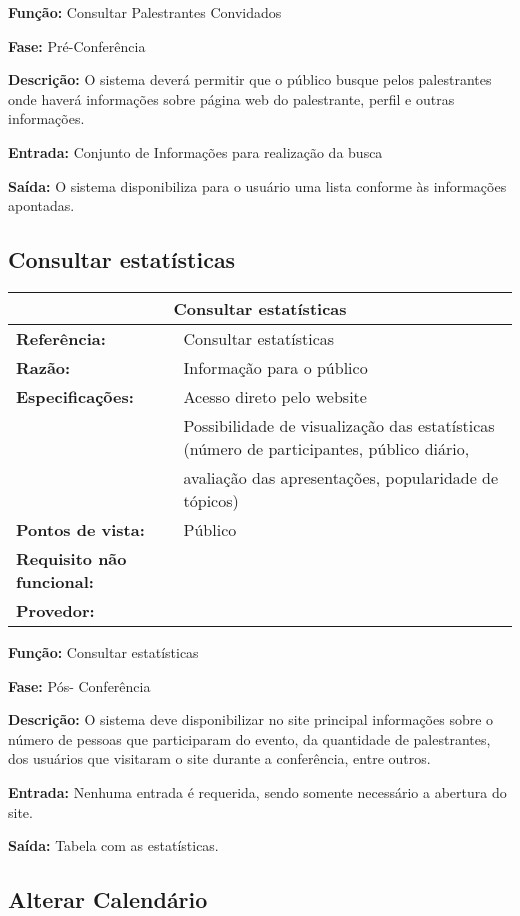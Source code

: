 \documentclass[letter]{article}
\begin{document}
\textbf{Função:}  Consultar Palestrantes Convidados

\textbf{Fase:}  Pré-Conferência

\textbf{Descrição:}  O sistema deverá permitir que o público busque pelos palestrantes onde haverá informações sobre página web do palestrante, perfil e outras informações.

\textbf{Entrada:}  Conjunto de Informações para realização da busca

\textbf{Saída:}  O sistema disponibiliza para o usuário uma lista conforme às informações apontadas.

\newpage
\subsection{Consultar estatísticas}


\begin{table}[h!]\begin{center}
\begin{tabular}{|ll|}
\hline 
\multicolumn{2}{|c|}{\textbf{Consultar estatísticas}}\tabularnewline
\hline
\textbf{Referência:} & Consultar estatísticas\tabularnewline
\textbf{Razão:} & Informação para o público\tabularnewline
\textbf{Especificações:} & Acesso direto pelo website\tabularnewline
 & Possibilidade de visualização das estatísticas (número de participantes,
público diário,\tabularnewline
 & avaliação das apresentações, popularidade de tópicos)\tabularnewline
\textbf{Pontos de vista:} & Público\tabularnewline
\textbf{Requisito não funcional:} & \tabularnewline
\textbf{Provedor:} & \tabularnewline
\hline\end{tabular}\end{center}
\end{table}


\textbf{Função:}  Consultar estatísticas

\textbf{Fase:}  Pós- Conferência

\textbf{Descrição:}  O sistema deve disponibilizar no site principal informações sobre o número de pessoas que participaram do evento, da quantidade de palestrantes, dos usuários que visitaram o site durante a conferência, entre outros.

\textbf{Entrada:}  Nenhuma entrada é requerida, sendo somente necessário a abertura do site.

\textbf{Saída:}  Tabela com as estatísticas.
 

\subsection{Alterar Calendário}
\end{document}
